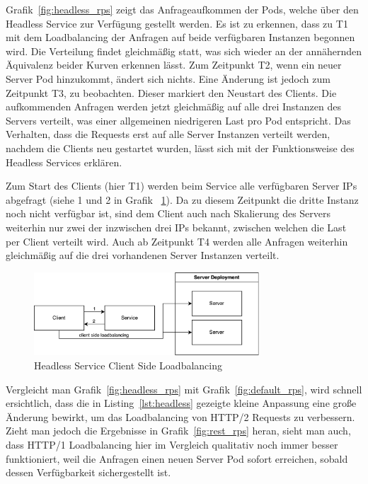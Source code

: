 Grafik~\ref{fig:headless_rps} zeigt das Anfrageaufkommen der Pods, welche über den Headless Service zur Verfügung gestellt werden.
Es ist zu erkennen, dass zu T1 mit dem Loadbalancing der Anfragen auf beide verfügbaren Instanzen begonnen wird.
Die Verteilung findet gleichmäßig statt, was sich wieder an der annähernden Äquivalenz beider Kurven erkennen lässt.
Zum Zeitpunkt T2, wenn ein neuer Server Pod hinzukommt, ändert sich nichts.
Eine Änderung ist jedoch zum Zeitpunkt T3, zu beobachten.
Dieser markiert den Neustart des Clients.
Die aufkommenden Anfragen werden jetzt gleichmäßig auf alle drei Instanzen des Servers verteilt, was einer allgemeinen niedrigeren Last pro Pod entspricht.
Das Verhalten, dass die Requests erst auf alle Server Instanzen verteilt werden, nachdem die Clients neu gestartet wurden, lässt sich mit der Funktionsweise des Headless Services erklären.

Zum Start des Clients (hier T1) werden beim Service alle verfügbaren Server IPs abgefragt (siehe 1 und 2 in Grafik ~\ref{fig:headless_loadbalancing}).
Da zu diesem Zeitpunkt die dritte Instanz noch nicht verfügbar ist, sind dem Client auch nach Skalierung des Servers weiterhin nur zwei der inzwischen drei IPs bekannt, zwischen welchen die Last per Client verteilt wird.
Auch ab Zeitpunkt T4 werden alle Anfragen weiterhin gleichmäßig auf die drei vorhandenen Server Instanzen verteilt.

\begin{figure}[H]
    \centering
    \includegraphics[width=0.75\textwidth]{img/headless_loadbalancing}
    \caption{Headless Service Client Side Loadbalancing}
    \label{fig:headless_loadbalancing}
\end{figure}

Vergleicht man Grafik~\ref{fig:headless_rps} mit Grafik~\ref{fig:default_rps}, wird schnell ersichtlich, dass die in Listing~\ref{lst:headless} gezeigte kleine Anpassung eine große Änderung bewirkt, um das Loadbalancing von HTTP/2 Requests zu verbessern.
Zieht man jedoch die Ergebnisse in Grafik~\ref{fig:rest_rps} heran, sieht man auch, dass HTTP/1 Loadbalancing hier im Vergleich qualitativ noch immer besser funktioniert, weil die Anfragen einen neuen Server Pod sofort erreichen, sobald dessen Verfügbarkeit sichergestellt ist.

